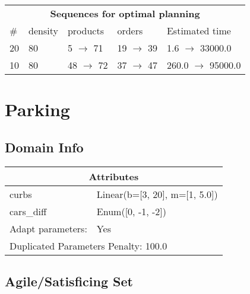 \documentclass{article}
\begin{document}
                            \begin{center}
                            \begin{tabular}{l|l|l|l|l}
                            \multicolumn{5}{c}{\bf \large Sequences for optimal planning}\\
                            \# & density & products & orders & Estimated time\\\midrule
                            20&80&5 $\rightarrow$ 71&19 $\rightarrow$ 39&1.6 $\rightarrow$ 33000.0\\
10&80&48 $\rightarrow$ 72&37 $\rightarrow$ 47&260.0 $\rightarrow$ 95000.0
                            \end{tabular}
                            \end{center}
                    \newpage \section{Parking}
                    \subsection*{Domain Info}

                    \begin{center}
                    \begin{tabular}{p{}p{}}
                    \multicolumn{2}{c}{\bf \large Attributes}\\\midrule
                    curbs & Linear(b=[3, 20], m=[1, 5.0])\\
cars\_diff & Enum([0, -1, -2])
                    
                    \\\midrule
                    Adapt parameters: & Yes  
                
                     \\\midrule
                    \multicolumn{2}{l}{Duplicated Parameters Penalty: 100.0}
                    \end{tabular}
                    \end{center}
                
                         \subsection*{Agile/Satisficing Set}
\end{document}
